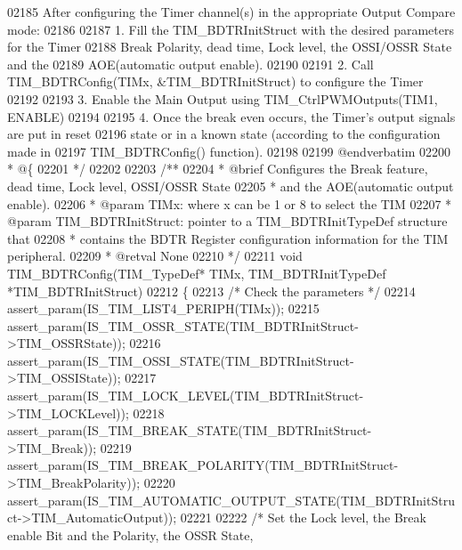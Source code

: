 \begin{DoxyCode}
02185 \textcolor{comment}{       After configuring the Timer channel(s) in the appropriate Output Compare mode: }
02186 \textcolor{comment}{                         }
02187 \textcolor{comment}{       1. Fill the TIM\_BDTRInitStruct with the desired parameters for the Timer}
02188 \textcolor{comment}{          Break Polarity, dead time, Lock level, the OSSI/OSSR State and the }
02189 \textcolor{comment}{          AOE(automatic output enable).}
02190 \textcolor{comment}{               }
02191 \textcolor{comment}{       2. Call TIM\_BDTRConfig(TIMx, &TIM\_BDTRInitStruct) to configure the Timer}
02192 \textcolor{comment}{          }
02193 \textcolor{comment}{       3. Enable the Main Output using TIM\_CtrlPWMOutputs(TIM1, ENABLE) }
02194 \textcolor{comment}{          }
02195 \textcolor{comment}{       4. Once the break even occurs, the Timer's output signals are put in reset}
02196 \textcolor{comment}{          state or in a known state (according to the configuration made in}
02197 \textcolor{comment}{          TIM\_BDTRConfig() function).}
02198 \textcolor{comment}{}
02199 \textcolor{comment}{@endverbatim}
02200 \textcolor{comment}{  * @\{}
02201 \textcolor{comment}{  */}
02202 
02203 \textcolor{comment}{/**}
02204 \textcolor{comment}{  * @brief  Configures the Break feature, dead time, Lock level, OSSI/OSSR State}
02205 \textcolor{comment}{  *         and the AOE(automatic output enable).}
02206 \textcolor{comment}{  * @param  TIMx: where x can be  1 or 8 to select the TIM }
02207 \textcolor{comment}{  * @param  TIM\_BDTRInitStruct: pointer to a TIM\_BDTRInitTypeDef structure that}
02208 \textcolor{comment}{  *         contains the BDTR Register configuration  information for the TIM peripheral.}
02209 \textcolor{comment}{  * @retval None}
02210 \textcolor{comment}{  */}
02211 \textcolor{keywordtype}{void} TIM_BDTRConfig(TIM\_TypeDef* TIMx, TIM\_BDTRInitTypeDef *TIM\_BDTRInitStruct)
02212 \{
02213   \textcolor{comment}{/* Check the parameters */}
02214   assert_param(IS\_TIM\_LIST4\_PERIPH(TIMx));
02215   assert_param(IS\_TIM\_OSSR\_STATE(TIM\_BDTRInitStruct->TIM\_OSSRState));
02216   assert_param(IS\_TIM\_OSSI\_STATE(TIM\_BDTRInitStruct->TIM\_OSSIState));
02217   assert_param(IS\_TIM\_LOCK\_LEVEL(TIM\_BDTRInitStruct->TIM\_LOCKLevel));
02218   assert_param(IS\_TIM\_BREAK\_STATE(TIM\_BDTRInitStruct->TIM\_Break));
02219   assert_param(IS\_TIM\_BREAK\_POLARITY(TIM\_BDTRInitStruct->TIM\_BreakPolarity));
02220   assert_param(IS\_TIM\_AUTOMATIC\_OUTPUT\_STATE(TIM\_BDTRInitStruct->TIM\_AutomaticOutput));
02221 
02222   \textcolor{comment}{/* Set the Lock level, the Break enable Bit and the Polarity, the OSSR State,}

\end{DoxyCode}
